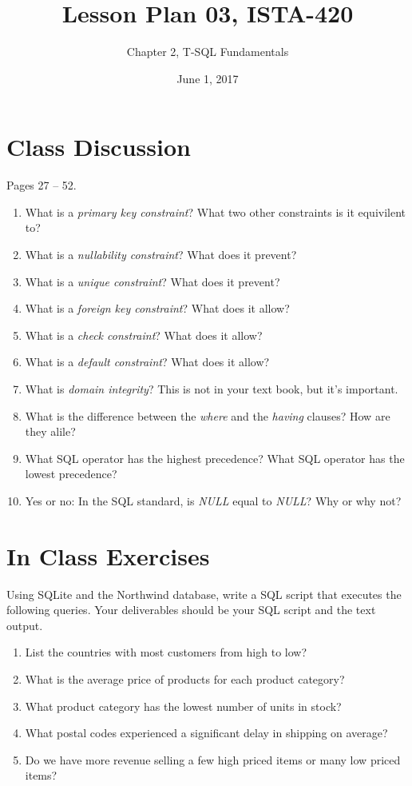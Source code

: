 \documentclass{article}
\title{Lesson Plan 03, ISTA-420}
\author{Chapter 2, T-SQL Fundamentals}
\date{June 1, 2017}
\begin{document}
    

    \maketitle{}

    \section{Class Discussion}

    Pages 27 -- 52.

    \begin{enumerate}

        \item What is a \textit{primary key constraint}? What two other constraints is it equivilent to?
        \item What is a \textit{nullability constraint}? What does it prevent?
        \item What is a \textit{unique constraint}? What does it prevent?
        \item What is a \textit{foreign key constraint}? What does it allow?
        \item What is a \textit{check constraint}? What does it allow?
        \item What is a \textit{default constraint}? What does it allow?
        \item What is \textit{domain integrity}? This is not in your text book, but it's important.
        \item What is the difference between the \textit{where} and the \textit{having} clauses? How are they alile?
        \item What SQL operator has the highest precedence? What SQL operator has the lowest precedence?
        \item Yes or no: In the SQL standard, is \textit{NULL} equal to  \textit{NULL}? Why or why not?



    \end{enumerate}


    \section{In Class Exercises}

Using SQLite and the Northwind database, write a SQL script that executes the following queries. Your deliverables should be your SQL script and the text output.

    \begin{enumerate}
\item List the countries with most customers from high to low?
\item What is the average price of products for each product category?
\item What product category has the lowest number of units in stock?
\item What postal codes experienced a significant delay in shipping on average?
\item Do we have more revenue selling a few high priced items or many low priced items?
    
    \end{enumerate}
\end{document}
